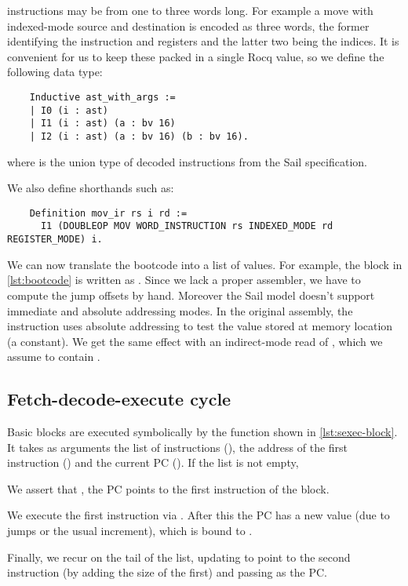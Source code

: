 \msp instructions may be from one to three words long. For example a move with indexed-mode source and destination is encoded as three words, the former identifying the instruction and registers and the latter two being the indices. It is convenient for us to keep these packed in a single Rocq value, so we define the following data type:
\begin{verbatim}
    Inductive ast_with_args :=
    | I0 (i : ast)
    | I1 (i : ast) (a : bv 16)
    | I2 (i : ast) (a : bv 16) (b : bv 16).
\end{verbatim}
where  is the union type of decoded instructions from the Sail specification.

\pagebreak\noindent
We also define shorthands such as:
\begin{verbatim}
    Definition mov_ir rs i rd :=
      I1 (DOUBLEOP MOV WORD_INSTRUCTION rs INDEXED_MODE rd REGISTER_MODE) i.
\end{verbatim}

We can now translate the bootcode into a list of  values. For example, the  block in \cref{lst:bootcode} is written as . Since we lack a proper assembler, we have to compute the jump offsets by hand. Moreover the Sail model doesn't support immediate and absolute addressing modes. In the original assembly, the  instruction uses absolute addressing to test the value stored at memory location  (a constant). We get the same effect with an indirect-mode read of , which we assume to contain .

\subsection{Fetch-decode-execute cycle}

Basic blocks are executed symbolically by the  function shown in \cref{lst:sexec-block}. It takes as arguments the list of instructions (), the address of the first instruction () and the current PC (). If the list is not empty,
\begin{labeling}{}
\item[\circref{sexec-block-1}] We assert that , \ie the PC points to the first instruction of the block.
\item[\circref{sexec-block-2}] We execute the first instruction via . After this the PC has a new value (due to jumps or the usual increment), which is bound to .
\item[\circref{sexec-block-3}] Finally, we recur on %
  the tail of the list, updating  to point to the second instruction (by adding the size of the first) and passing  as the PC.
\end{labeling}

